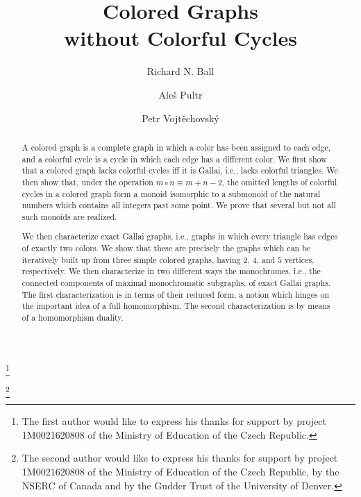 \documentclass[12pt]{amsart}
\theoremstyle{plain}
\numberwithin{equation}{section}
\begin{document}
\title[Colored Graphs without Colorful Cycles]{Colored Graphs \\without Colorful Cycles}

\author{Richard N. Ball}
\address[Ball]{Dept. of Mathematics,
University of Denver, 2360 S Gaylord St., Denver, Colorado 80208, U.S.A.}
 

\author{Ale\v{s} Pultr}
\address[Pultr]{Dept. of Applied Mathematics and ITI, MFF
Charles University, Malostransk\'{e} n\'{a}m. 25, Praha 1, 11800, Czech
Republic} 

\author{Petr Vojt\v{e}chovsk\'{y}}
\address[Vojt\v{e}chovsk\'y]{Dept. of Mathematics,
University of Denver, 2360 S Gaylord St., Denver, Colorado 80208, U.S.A.}
 

\thanks{The first author would like to express his thanks for support by project
1M0021620808 of the Ministry of Education of the Czech Republic.}

\thanks{The second author would like to express his thanks for support by project
1M0021620808 of the Ministry of Education of the Czech Republic, by the NSERC
of Canada and by the Gudder Trust of the University of Denver.}





\begin{abstract}
A colored graph is a complete graph in which a color has been assigned to each
edge, and a colorful cycle is a cycle in which each edge has a different color.
We first show that a colored graph lacks colorful cycles iff it is Gallai,
i.e., lacks colorful triangles. We then show that, under the operation $m\circ
n\equiv m+n-2$, the omitted lengths of colorful cycles in a colored graph form
a monoid isomorphic to a submonoid of the natural numbers which contains all
integers past some point. We prove that several but not all such monoids are
realized.

We then characterize exact Gallai graphs, i.e., graphs in which every triangle
has edges of exactly two colors. We show that these are precisely the graphs
which can be iteratively built up from three simple colored graphs, having $2$,
$4$, and $5$ vertices, respectively. We then characterize in two different ways
the monochromes, i.e., the connected components of maximal monochromatic
subgraphs, of exact Gallai graphs. The first characterization is in terms of
their reduced form, a notion which hinges on the important idea of a full
homomorphism. The second characterization is by means of a homomorphism
duality.
\end{abstract}
\end{document}

